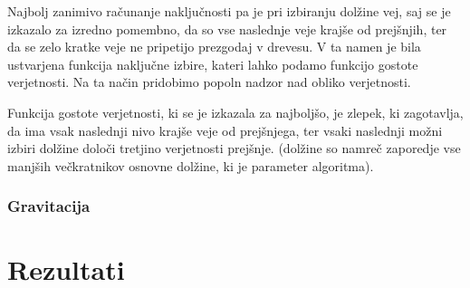 \documentclass[10pt,a4paper,oneside]{book}
\begin{document}
Najbolj zanimivo računanje naključnosti pa je pri izbiranju dolžine
vej, saj se je izkazalo za izredno pomembno, da so vse naslednje veje
krajše od prejšnjih, ter da se zelo kratke veje ne pripetijo prezgodaj
v drevesu. V ta namen je bila ustvarjena funkcija naključne izbire,
kateri lahko podamo funkcijo gostote verjetnosti. Na ta način
pridobimo popoln nadzor nad obliko verjetnosti.

Funkcija gostote verjetnosti, ki se je izkazala za najboljšo, je
zlepek, ki zagotavlja, da ima vsak naslednji nivo krajše veje od
prejšnjega, ter vsaki naslednji možni izbiri dolžine določi tretjino
verjetnosti prejšnje. (dolžine so namreč zaporedje vse manjših
večkratnikov osnovne dolžine, ki je parameter algoritma).

\subsection{Gravitacija}


\chapter{Rezultati}
\end{document}
